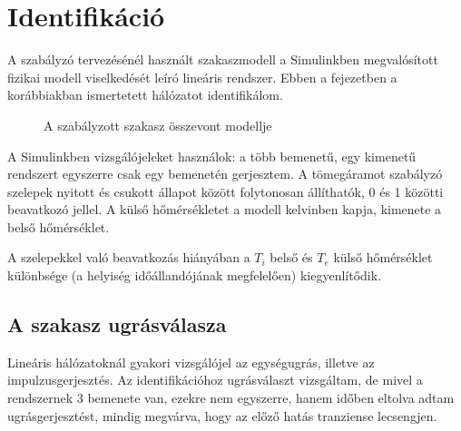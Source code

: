 \chapter{Identifikáció}\label{chap:ident}


A szabályzó tervezésénél használt szakaszmodell a Simulinkben megvalósított fizikai modell viselkedését leíró lineáris rendszer. Ebben a fejezetben a korábbiakban ismertetett hálózatot identifikálom.
\begin{figure}[h]
	\centering
	
	\caption{A szabályzott szakasz összevont modellje}
	\label{tikz:simulation}
\end{figure}

A Simulinkben vizsgálójeleket használok: a több bemenetű, egy kimenetű rendszert egyszerre csak egy bemenetén gerjesztem. A tömegáramot szabályzó szelepek nyitott és csukott állapot között folytonosan állíthatók, 0 és 1 közötti beavatkozó jellel. A külső hőmérsékletet a modell kelvinben kapja, kimenete a belső hőmérséklet.

A szelepekkel való beavatkozás hiányában a $T_i$ belső és $T_e$ külső hőmérséklet különbsége (a helyiség időállandójának megfelelően) kiegyenlítődik.


\section{A szakasz ugrásválasza}

Lineáris hálózatoknál gyakori vizsgálójel az egységugrás, illetve az impulzusgerjesztés. Az identifikációhoz ugrásválaszt vizsgáltam, de mivel a rendszernek 3 bemenete van, ezekre nem egyszerre, hanem időben eltolva adtam ugrásgerjesztést, mindig megvárva, hogy az előző hatás tranziense lecsengjen.

